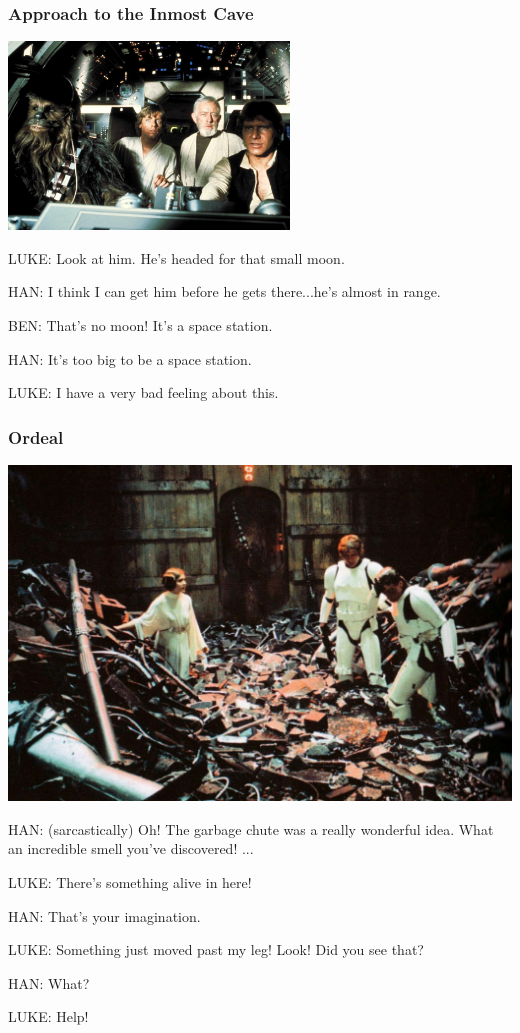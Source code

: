 \documentclass{beamer}
\begin{document}
\begin{frame}\frametitle{Approach to the Inmost Cave
}
{\includegraphics[height=5cm]{Got_A_Bad_feeling.jpg}}


LUKE: Look at him. He's headed for that small moon.



HAN: I think I can get him before he gets there...he's almost in
range.



BEN: That's no moon! It's a space station.



HAN: It's too big to be a space station.

LUKE: I have a very bad feeling about this.

\end{frame}
\begin{frame}\frametitle{Ordeal}

\includegraphics[scale=0.125]{garbage_chute.jpg}

{\small
HAN: (sarcastically) Oh! The garbage chute was a really wonderful
idea. What an incredible smell you've discovered! ...

LUKE: There's something alive in here!

HAN: That's your imagination.

LUKE: Something just moved past my leg! Look! Did you see that?

HAN: What?

LUKE: Help!
}

\end{frame}
\end{document}
